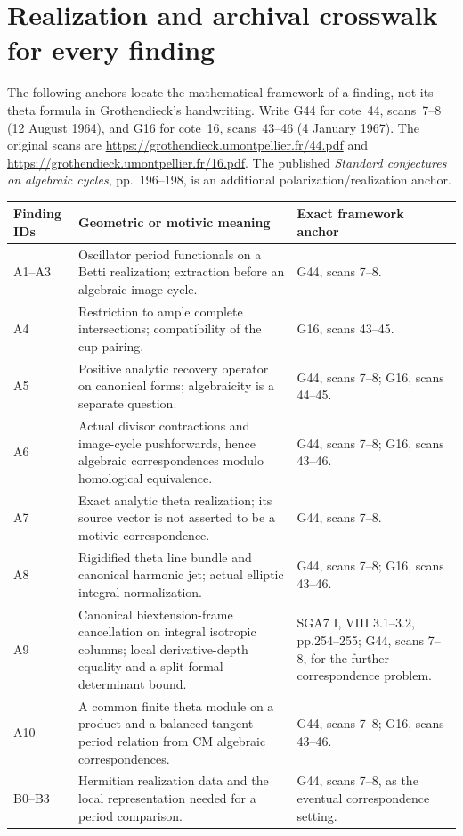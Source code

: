 \documentclass[11pt]{article}
\theoremstyle{definition}\newtheorem{definition}[theorem]{Definition}\newtheorem{remark}[theorem]{Remark}
\begin{document}
\appendix
\section{Realization and archival crosswalk for every finding}

The following anchors locate the mathematical framework of a
finding, not its theta formula in Grothendieck's handwriting.
Write G44 for cote~44, scans~7--8 (12 August 1964), and G16 for
cote~16, scans~43--46 (4 January 1967). The original scans are
\url{https://grothendieck.umontpellier.fr/44.pdf} and
\url{https://grothendieck.umontpellier.fr/16.pdf}.
The published \emph{Standard conjectures on algebraic cycles},
pp.~196--198, is an additional polarization/realization anchor.

\begin{longtable}{@{}p{.18\linewidth}p{.48\linewidth}p{.27\linewidth}@{}}
\toprule Finding IDs & Geometric or motivic meaning & Exact framework anchor\\\midrule\endhead
A1--A3 & Oscillator period functionals on a Betti realization; extraction before an algebraic image cycle. & G44, scans 7--8.\\
A4 & Restriction to ample complete intersections; compatibility of the cup pairing. & G16, scans 43--45.\\
A5 & Positive analytic recovery operator on canonical forms; algebraicity is a separate question. & G44, scans 7--8; G16, scans 44--45.\\
A6 & Actual divisor contractions and image-cycle pushforwards, hence algebraic correspondences modulo homological equivalence. & G44, scans 7--8; G16, scans 43--46.\\
A7 & Exact analytic theta realization; its source vector is not asserted to be a motivic correspondence. & G44, scans 7--8.\\
A8 & Rigidified theta line bundle and canonical harmonic jet; actual elliptic integral normalization. & G44, scans 7--8; G16, scans 43--46.\\
A9 & Canonical biextension-frame cancellation on integral isotropic columns; local derivative-depth equality and a split-formal determinant bound. & SGA7 I, VIII 3.1--3.2, pp.254--255; G44, scans 7--8, for the further correspondence problem.\\
A10 & A common finite theta module on a product and a balanced tangent-period relation from CM algebraic correspondences. & G44, scans 7--8; G16, scans 43--46.\\
B0--B3 & Hermitian realization data and the local representation needed for a period comparison. & G44, scans 7--8, as the eventual correspondence setting.\\

\end{longtable}
\end{document}
